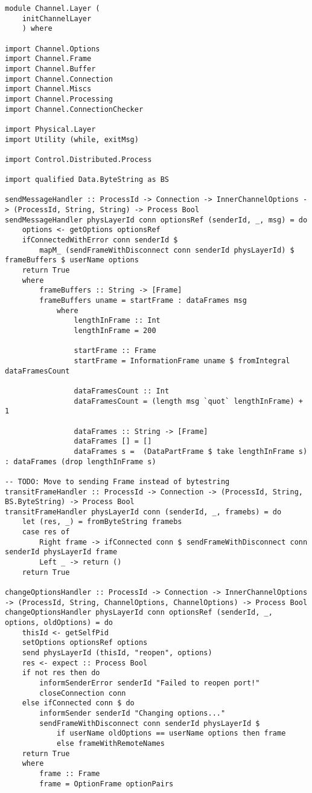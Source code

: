 \documentclass[russian,utf8,simple,emptystyle]{eskdtext}
\begin{document}
\begin{lstlisting}
module Channel.Layer (
    initChannelLayer
    ) where

import Channel.Options
import Channel.Frame 
import Channel.Buffer
import Channel.Connection
import Channel.Miscs
import Channel.Processing 
import Channel.ConnectionChecker 

import Physical.Layer 
import Utility (while, exitMsg)

import Control.Distributed.Process

import qualified Data.ByteString as BS

sendMessageHandler :: ProcessId -> Connection -> InnerChannelOptions -> (ProcessId, String, String) -> Process Bool 
sendMessageHandler physLayerId conn optionsRef (senderId, _, msg) = do 
    options <- getOptions optionsRef
    ifConnectedWithError conn senderId $ 
        mapM_ (sendFrameWithDisconnect conn senderId physLayerId) $ frameBuffers $ userName options
    return True
    where
        frameBuffers :: String -> [Frame]
        frameBuffers uname = startFrame : dataFrames msg
            where  
                lengthInFrame :: Int 
                lengthInFrame = 200

                startFrame :: Frame
                startFrame = InformationFrame uname $ fromIntegral dataFramesCount

                dataFramesCount :: Int 
                dataFramesCount = (length msg `quot` lengthInFrame) + 1

                dataFrames :: String -> [Frame]
                dataFrames [] = []
                dataFrames s =  (DataPartFrame $ take lengthInFrame s) : dataFrames (drop lengthInFrame s)

-- TODO: Move to sending Frame instead of bytestring
transitFrameHandler :: ProcessId -> Connection -> (ProcessId, String, BS.ByteString) -> Process Bool 
transitFrameHandler physLayerId conn (senderId, _, framebs) = do
    let (res, _) = fromByteString framebs 
    case res of 
        Right frame -> ifConnected conn $ sendFrameWithDisconnect conn senderId physLayerId frame
        Left _ -> return ()
    return True

changeOptionsHandler :: ProcessId -> Connection -> InnerChannelOptions -> (ProcessId, String, ChannelOptions, ChannelOptions) -> Process Bool 
changeOptionsHandler physLayerId conn optionsRef (senderId, _, options, oldOptions) = do 
    thisId <- getSelfPid
    setOptions optionsRef options
    send physLayerId (thisId, "reopen", options)
    res <- expect :: Process Bool
    if not res then do
        informSenderError senderId "Failed to reopen port!"
        closeConnection conn
    else ifConnected conn $ do 
        informSender senderId "Changing options..."
        sendFrameWithDisconnect conn senderId physLayerId $
            if userName oldOptions == userName options then frame 
            else frameWithRemoteNames
    return True
    where
        frame :: Frame
        frame = OptionFrame optionPairs


\end{lstlisting}
\end{document}
